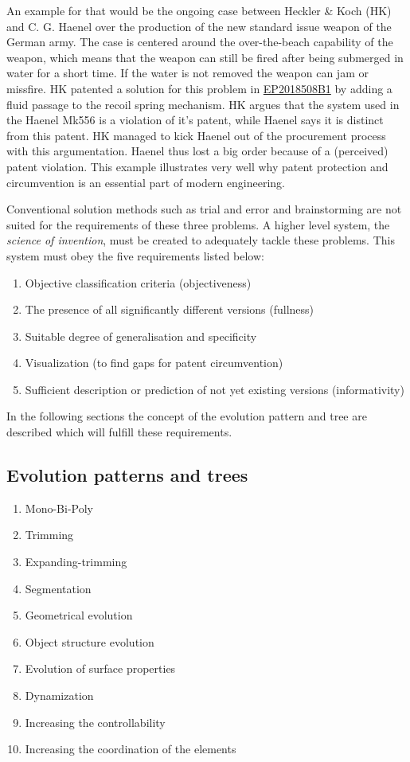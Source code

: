 \documentclass[11pt,a4paper]{article}
\begin{document}
An example for that would be the ongoing case between Heckler \& Koch (HK) and
C. G. Haenel over the production of the new standard issue weapon of the
German army. The case is centered around the over-the-beach capability of the
weapon, which means that the weapon can still be fired after being submerged
in water for a short time. If the water is not removed the weapon can jam or
missfire. HK patented a solution for this problem in
\href{https://patents.google.com/patent/EP2018508B1/en}{EP2018508B1} by adding
a fluid passage to the recoil spring mechanism. HK argues that the system used
in the Haenel Mk556 is a violation of it's patent, while Haenel says it is
distinct from this patent. HK managed to kick Haenel out of the procurement
process with this argumentation. Haenel thus lost a big order because of a
(perceived) patent violation. This example illustrates very well why patent
protection and circumvention is an essential part of modern engineering.

Conventional solution methods such as trial and error and brainstorming are
not suited for the requirements of these three problems. A higher level
system, the \textit{science of invention}, must be created to adequately
tackle these problems. This system must obey the five requirements listed
below: 
\begin{enumerate}[noitemsep]
\item Objective classification criteria (objectiveness)
\item The presence of all significantly different versions (fullness)
\item Suitable degree of generalisation and specificity
\item Visualization (to find gaps for patent circumvention)
\item Sufficient description or prediction of not yet existing versions
  (informativity)
\end{enumerate}

In the following sections the concept of the evolution pattern and tree are
described which will fulfill these requirements.

\subsection{Evolution patterns and trees}

\begin{enumerate}[noitemsep]
\item Mono-Bi-Poly
\item Trimming
\item Expanding-trimming
\item Segmentation
\item Geometrical evolution
\item Object structure evolution
\item Evolution of surface properties
\item Dynamization
\item Increasing the controllability
\item Increasing the coordination of the elements
\end{enumerate}
\end{document}
